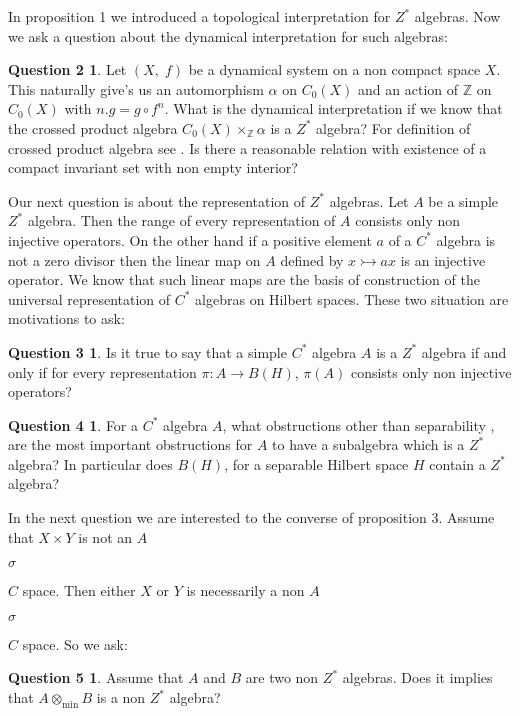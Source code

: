\documentclass[a4paper,10pt]{amsart}
\theoremstyle{definition}
\newtheorem*{question2}{Question   2}
\newtheorem*{question3}{Question   3}
\newtheorem*{question4}{Question   4}
\newtheorem*{question5} {Question  5}
\theoremstyle{plain}
\begin{document}
In proposition 1 we introduced  a topological interpretation for $Z^{*}$ algebras. Now  we ask a  question about the dynamical interpretation  for  such  algebras:
\begin{question2}
Let $(X,\;f)$  be  a  dynamical system on a  non compact space $X$. This  naturally give's us  an automorphism $\alpha$ on $C_{0}(X)$ and  an action of $\mathbb{Z}$ on $C_{0}(X)$ with $n.g=g\circ f^{n}$. What is  the    dynamical interpretation if  we know that  the crossed product algebra $C_{0}(X) \times_{\mathbb{Z}} \alpha$ is  a  $Z^{*}$  algebra? For  definition of crossed product algebra see \cite[page 222]{DAVID}. Is there a reasonable relation with existence of a  compact invariant  set with non empty interior?
\end{question2}
Our  next question is  about the  representation of $Z^{*}$  algebras. Let $A$  be a  simple  $Z^{*}$ algebra. Then the range of  every representation of $A$ consists only non injective  operators. On the other hand if  a positive element $a$ of a $C^{*}$  algebra is  not  a zero divisor then the linear map on $A$ defined by $x\rightarrowtail ax$ is  an injective operator. We know that such linear maps are the basis of construction of the universal representation of $C^{*}$ algebras on Hilbert spaces. These two situation are  motivations to  ask:
\begin{question3}
Is it true  to say that a simple $C^{*}$  algebra  $A$ is  a  $Z^{*}$  algebra if  and only  if for  every representation
$\pi: A\rightarrow B(H)$, $\pi(A)$ consists only non injective operators?
\end{question3}
\begin{question4}
For  a  $C^{*}$ algebra $A$, what obstructions other than separability , are the most important obstructions for $A$ to have a subalgebra which is  a  $Z^{*}$ algebra? In particular does  $B(H)$, for  a  separable Hilbert space  $H$ contain  a $Z^{*}$ algebra?
\end{question4}
In the next question we are interested to the converse of proposition 3. Assume that $X\times Y$ is not an $A$\begin{Large}${\sigma}$\end{Large}$C$ space. Then either $X$ or $Y$ is necessarily a  non $A$\begin{Large}${\sigma}$\end{Large}$C$ space. So we ask:
\begin{question5}
Assume that $A$ and $B$ are two non $Z^{*}$ algebras. Does it implies that $A \otimes_{\text{min}} B$ is  a non $Z^{*}$ algebra?
\end{question5}
\end{document}
